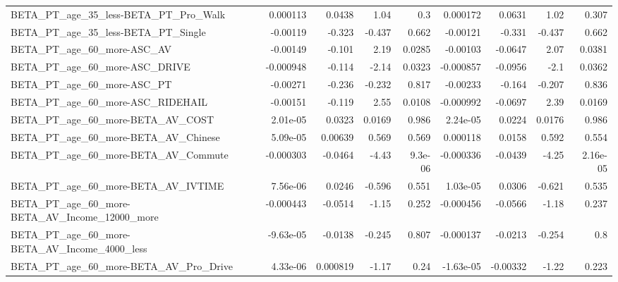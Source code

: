 \begin{tabular}{lrrrrrrrr}
BETA\_PT\_age\_35\_less-BETA\_PT\_Pro\_Walk               &    0.000113 &       0.0438 &      1.04 &      0.3 &   0.000172 &      0.0631 &         1.02 &         0.307 \\
BETA\_PT\_age\_35\_less-BETA\_PT\_Single                 &    -0.00119 &       -0.323 &    -0.437 &    0.662 &   -0.00121 &      -0.331 &       -0.437 &         0.662 \\
BETA\_PT\_age\_60\_more-ASC\_AV                         &    -0.00149 &       -0.101 &      2.19 &   0.0285 &   -0.00103 &     -0.0647 &         2.07 &        0.0381 \\
BETA\_PT\_age\_60\_more-ASC\_DRIVE                      &   -0.000948 &       -0.114 &     -2.14 &   0.0323 &  -0.000857 &     -0.0956 &         -2.1 &        0.0362 \\
BETA\_PT\_age\_60\_more-ASC\_PT                         &    -0.00271 &       -0.236 &    -0.232 &    0.817 &   -0.00233 &      -0.164 &       -0.207 &         0.836 \\
BETA\_PT\_age\_60\_more-ASC\_RIDEHAIL                   &    -0.00151 &       -0.119 &      2.55 &   0.0108 &  -0.000992 &     -0.0697 &         2.39 &        0.0169 \\
BETA\_PT\_age\_60\_more-BETA\_AV\_COST                   &    2.01e-05 &       0.0323 &    0.0169 &    0.986 &   2.24e-05 &      0.0224 &       0.0176 &         0.986 \\
BETA\_PT\_age\_60\_more-BETA\_AV\_Chinese                &    5.09e-05 &      0.00639 &     0.569 &    0.569 &   0.000118 &      0.0158 &        0.592 &         0.554 \\
BETA\_PT\_age\_60\_more-BETA\_AV\_Commute                &   -0.000303 &      -0.0464 &     -4.43 &  9.3e-06 &  -0.000336 &     -0.0439 &        -4.25 &      2.16e-05 \\
BETA\_PT\_age\_60\_more-BETA\_AV\_IVTIME                 &    7.56e-06 &       0.0246 &    -0.596 &    0.551 &   1.03e-05 &      0.0306 &       -0.621 &         0.535 \\
BETA\_PT\_age\_60\_more-BETA\_AV\_Income\_12000\_more      &   -0.000443 &      -0.0514 &     -1.15 &    0.252 &  -0.000456 &     -0.0566 &        -1.18 &         0.237 \\
BETA\_PT\_age\_60\_more-BETA\_AV\_Income\_4000\_less       &   -9.63e-05 &      -0.0138 &    -0.245 &    0.807 &  -0.000137 &     -0.0213 &       -0.254 &           0.8 \\
BETA\_PT\_age\_60\_more-BETA\_AV\_Pro\_Drive              &    4.33e-06 &     0.000819 &     -1.17 &     0.24 &  -1.63e-05 &    -0.00332 &        -1.22 &         0.223 \\

\end{tabular}
